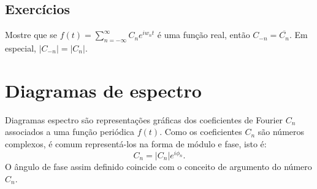 \subsection*{Exercícios}
\begin{exer} Mostre que se $f(t)=\sum_{n=-\infty}^\infty C_n e^{i w_n t}$ é uma função real, então $C_{-n}=\overline{C_n}$. Em especial, $|C_{-n}|=|C_n|$.
\end{exer}

\section{Diagramas de espectro}
Diagramas espectro são representações gráficas dos coeficientes de Fourier $C_n$ associados a uma função periódica $f(t)$. Como os coeficientes $C_n$ são números complexos, é comum representá-los na forma de módulo e fase, isto é:
\begin{equation}C_n = |C_n|e^{i\phi_n}.\end{equation}
O ângulo de fase assim definido coincide com o conceito de argumento do número $C_n$.
